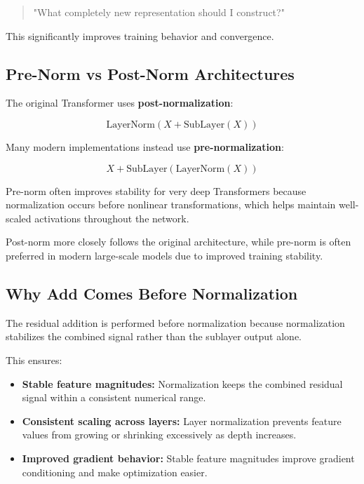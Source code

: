 \documentclass[11pt]{article}
\begin{document}
\begin{quote}
"What completely new representation should I construct?"
\end{quote}

This significantly improves training behavior and convergence.

\subsection{Pre-Norm vs Post-Norm Architectures}

The original Transformer uses \textbf{post-normalization}:

\[
\text{LayerNorm}(X + \text{SubLayer}(X))
\]

Many modern implementations instead use \textbf{pre-normalization}:

\[
X + \text{SubLayer}(\text{LayerNorm}(X))
\]

Pre-norm often improves stability for very deep Transformers because normalization occurs before nonlinear transformations, which helps maintain well-scaled activations throughout the network.

Post-norm more closely follows the original architecture, while pre-norm is often preferred in modern large-scale models due to improved training stability.

\subsection{Why Add Comes Before Normalization}

The residual addition is performed before normalization because normalization stabilizes the combined signal rather than the sublayer output alone.

This ensures:

\begin{itemize}

\item \textbf{Stable feature magnitudes:}  
Normalization keeps the combined residual signal within a consistent numerical range.

\item \textbf{Consistent scaling across layers:}  
Layer normalization prevents feature values from growing or shrinking excessively as depth increases.

\item \textbf{Improved gradient behavior:}  
Stable feature magnitudes improve gradient conditioning and make optimization easier.

\end{itemize}
\end{document}
